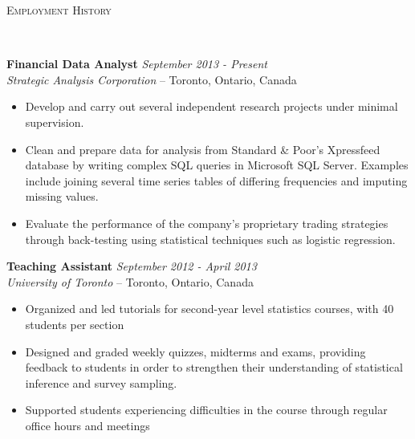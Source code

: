 \documentclass[9pt]{article}
\newenvironment{changemargin}[2]{%
  \begin{list}{}{%
    \setlength{\topsep}{0pt}%
    \setlength{\leftmargin}{#1}%
    \setlength{\rightmargin}{#2}%
    \setlength{\listparindent}{\parindent}%
    \setlength{\itemindent}{\parindent}%
    \setlength{\parsep}{\parskip}%
  }%
  \item[]}{\end{list}
}
\newcommand{\lineover}{
  \begin{changemargin}{-0.05in}{-0.05in}
    \vspace*{-8pt}
    \hrulefill \\
    \vspace*{-2pt}
  \end{changemargin}
}
\newcommand{\header}[1]{
  \begin{changemargin}{-0.5in}{-0.5in}
    {\large \scshape{#1}}\\
    \lineover
  \end{changemargin}
}
\newenvironment{body} {
  \vspace*{-16pt}
  \begin{changemargin}{-0.25in}{-0.5in}
  }
  {\end{changemargin}
}
\begin{document}
\smallskip

\header{Employment History}

\begin{body}
  \vspace{14pt}

  \textbf{Financial Data Analyst} \hfill \emph{September 2013 - Present}\\
  \emph{Strategic Analysis Corporation} -- Toronto, Ontario, Canada
  \vspace*{-4pt}
  \begin{itemize} \itemsep -0pt  %
    \item Develop and carry out several independent research projects under
      minimal supervision.
    \item Clean and prepare data for analysis from Standard \& Poor's Xpressfeed
      database by writing complex SQL queries in Microsoft SQL Server. Examples
      include joining several time series tables of differing frequencies and
      imputing missing values.
    \item Evaluate the performance of the company's proprietary trading
      strategies through back-testing using statistical techniques such as logistic
      regression.
  \end{itemize}

  \textbf{Teaching Assistant} \hfill \emph{September 2012 - April 2013}\\
  \emph{University of Toronto} -- Toronto, Ontario, Canada
  \vspace*{-4pt}
  \begin{itemize} \itemsep -0pt  %
    \item Organized and led tutorials for second-year level statistics courses,
      with 40 students per section
    \item Designed and graded weekly quizzes, midterms and exams, providing feedback
      to students in order to strengthen their understanding of statistical
      inference and survey sampling.
    \item Supported students experiencing difficulties in the course through
      regular office hours and meetings
  \end{itemize}



\end{body}
\end{document}
